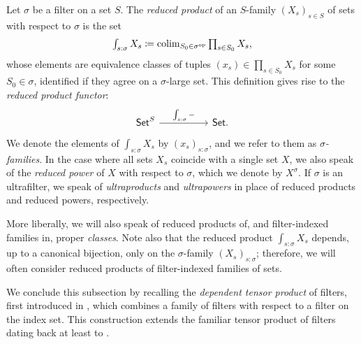 \begin{defn}\label{defn:reduced-products-and-ultraproducts}
    Let $\sigma$ be a filter on a set $S$. The \emph{reduced product} of an $S$-family $(X_s)_{s\in S}$ of sets with respect to $\sigma$ is the set
    \[\textstyle \int_{s:\sigma} X_s \coloneqq \operatorname*{colim}_{S_0\in\sigma^{\mathrm{op}}}\prod_{s\in S_0}X_s,\]
    whose elements are equivalence classes of tuples $(x_s) \in \prod_{s\in S_0}X_s$ for some $S_0 \in \sigma$, identified if they agree on a $\sigma$-large set. This definition gives rise to the \emph{reduced product functor}:
    \[\begin{tikzcd}[column sep = 50pt]
    	{\Set^S} & {\Set .}
    	\arrow["{\int_{s:\sigma}-}", from=1-1, to=1-2]
    \end{tikzcd}\]
    We denote the elements of $\int_{s:\sigma} X_s$ by $(x_s)_{s:\sigma}$, and we refer to them as \emph{$\sigma$-families}. In the case where all sets $X_s$ coincide with a single set $X$, we also speak of the \emph{reduced power} of $X$ with respect to $\sigma$, which we denote by $X^\sigma$. If $\sigma$ is an ultrafilter, we speak of \emph{ultraproducts} and \emph{ultrapowers} in place of reduced products and reduced powers, respectively.
\end{defn}

\begin{rmk}\label{rmk:reduced-products-and-ultraproducts}
    More liberally, we will also speak of reduced products of, and filter-indexed families in, proper \emph{classes}. Note also that the reduced product $\int_{s:\sigma} X_s$ depends, up to a canonical bijection, only on the $\sigma$-family $(X_s)_{s:\sigma}$; therefore, we will often consider reduced products of filter-indexed families of sets.
\end{rmk}

We conclude this subsection by recalling the \emph{dependent tensor product} of filters, first introduced in \cite[Def.\ 1.8]{katetovProductsFilters1968}, which combines a family of filters with respect to a filter on the index set. This construction extends the familiar tensor product of filters dating back at least to \cite[Thm.\ 1.10]{frayneReducedDirectProducts1962}.

